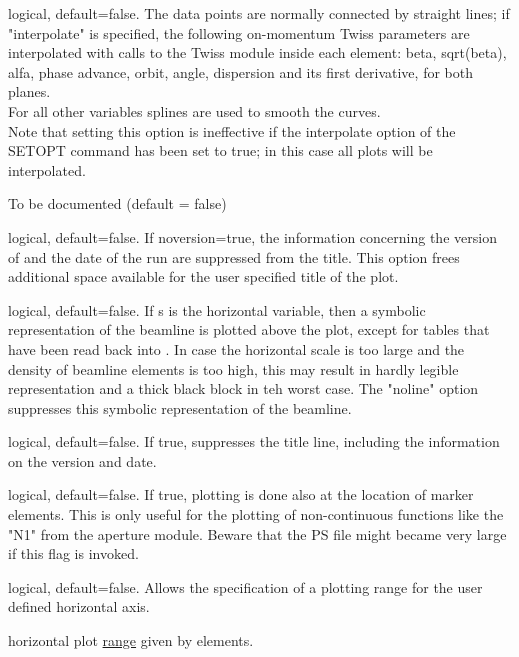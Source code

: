 \begin{madlist}
    logical, default=false. The data points are
     normally connected by straight lines; if "interpolate" is
     specified, the following on-momentum Twiss parameters are
     interpolated with calls to the Twiss module inside 
     each element: beta, sqrt(beta), alfa, phase advance, orbit, angle,
     dispersion and its first derivative, for both planes. \\ 
     For all other variables splines are used to smooth
     the curves. \\ 
     Note that setting this option is ineffective if the interpolate
     option of the SETOPT command has been set to true; in this case all
     plots will be interpolated.  

    To be documented (default = false)

    logical, default=false. If noversion=true, the
     information concerning the version of \madx and the date of the run
     are suppressed from the title.  
     This option frees additional space available for the user specified
     title of the plot.  

    logical, default=false. If s is the horizontal
     variable, then a symbolic representation of the beamline is plotted
     above the plot, except for tables that have been read back into \madx. 
     In case the horizontal scale is too large and the density of
     beamline elements is too high, this may result in hardly legible
     representation and a thick black block in teh worst case. 
     The "noline" option suppresses this symbolic representation of the
     beamline. 

    logical, default=false. If true, suppresses the title
     line, including the information on the version and date.  

    logical, default=false. If true, plotting is done
     also at the location of marker elements. This is only useful for
     the plotting of non-continuous functions like the "N1" from the
     aperture module. Beware that the PS file might became very large if
     this flag is invoked.
  
    logical, default=false. Allows the specification
     of a plotting range for the user defined horizontal axis.   

    horizontal plot
     \href{../Introduction/ranges.html}{range} given by elements.  


\end{madlist}
